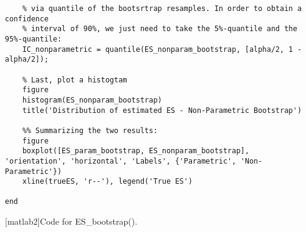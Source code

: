 \documentclass[11pt, a4paper]{article}
\begin{document}
\begin{lstlisting}[style=Matlab-editor]
    % Vector ES_nonparam_bootstrap now contains B estimates of ES calculated
    % via quantile of the bootsrtrap resamples. In order to obtain a confidence 
    % interval of 90%, we just need to take the 5%-quantile and the 95%-quantile:
    IC_nonparametric = quantile(ES_nonparam_bootstrap, [alpha/2, 1 - alpha/2]);
    
    % Last, plot a histogtam
    figure
    histogram(ES_nonparam_bootstrap)
    title('Distribution of estimated ES - Non-Parametric Bootstrap')
    
    %% Summarizing the two results:
    figure
    boxplot([ES_param_bootstrap, ES_nonparam_bootstrap], 'orientation', 'horizontal', 'Labels', {'Parametric', 'Non-Parametric'})
    xline(trueES, 'r--'), legend('True ES')

end

\end{lstlisting}
\label{matlab2}
[matlab2]{Code for ES\_bootstrap().}

\newpage
\end{document}
